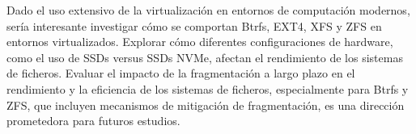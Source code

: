 Dado el uso extensivo de la virtualización en entornos de computación modernos, sería interesante investigar cómo se comportan Btrfs, EXT4, XFS y ZFS en entornos virtualizados. Explorar cómo diferentes configuraciones de hardware, como el uso de SSDs versus SSDs NVMe, afectan el rendimiento de los sistemas de ficheros. Evaluar el impacto de la fragmentación a largo plazo en el rendimiento y la eficiencia de los sistemas de ficheros, especialmente para Btrfs y ZFS, que incluyen mecanismos de mitigación de fragmentación, es una dirección prometedora para futuros estudios.
